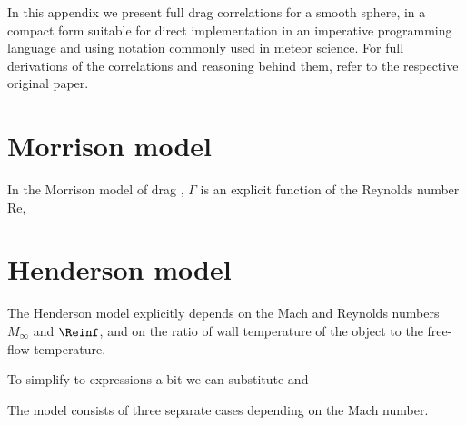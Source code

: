 In this appendix we present full drag correlations for a smooth sphere,
in a compact form suitable for direct implementation in an imperative programming language
and using notation commonly used in meteor science.
For full derivations of the correlations and reasoning behind them,
refer to the respective original paper.

\section{Morrison model} \label{DM}
    In the Morrison model of drag \citep{morrison2016}, $\Gamma$ is an explicit function
    of the Reynolds number $\mathrm{Re}$,

\section{Henderson model} \label{DH}
    The Henderson model \citep{henderson1976} explicitly depends on the Mach
    and Reynolds numbers $M_\infty$ and $\Reinf$,
    and on the ratio of wall temperature of the object to the free-flow temperature.

    To simplify to expressions a bit we can substitute
    and

    The model consists of three separate cases depending on the Mach number.

